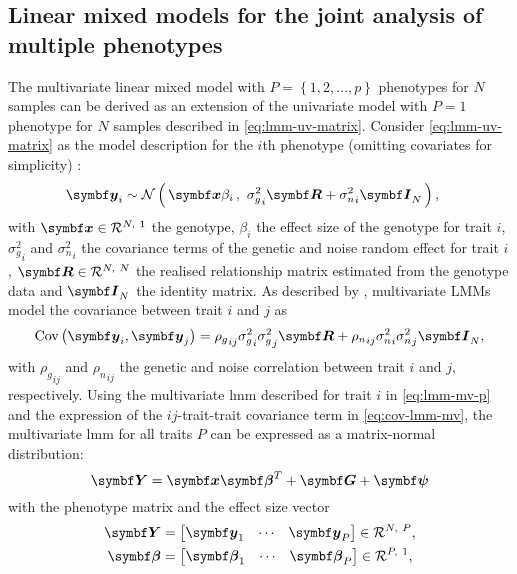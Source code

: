 \subsection{Linear mixed models for the joint analysis of multiple phenotypes}
The multivariate linear mixed model with \(P=\left\{1,2,\dots,p\right\}\) phenotypes for \(N\) samples can be derived as an extension of the univariate model with \(P=1\) phenotype for \(N\) samples described in \cref{eq:lmm-uv-matrix}. Consider \cref{eq:lmm-uv-matrix} as the model description for the \(i\)th phenotype (omitting covariates for simplicity) :
\begin{align} 
\mat{y}_i &\sim \normal {\mat{x}\beta_i}{{\sigma_g^2}_i\mat{R} + {\sigma_n^2}_i\mat{I}_N},
\label{eq:lmm-mv-p}
\end{align}
%
with \(\mat{x} \inR N 1\) the genotype, \(\beta_i\) the effect size of the genotype for trait \(i\),  \({\sigma_g^2}_i\) and \({\sigma_n^2}_i\) the covariance terms of the genetic and noise random effect for trait \(i\), \(\mat{R} \inR N N\)  the realised relationship matrix estimated from the genotype data and \(\mat{I}_N\) the identity matrix. As described by \citet{Henderson1976}, multivariate LMMs model the covariance between trait \(i\) and \(j\) as
\begin{align}
\text{Cov}\left(\mat{y}_i, \mat{y}_j\right) = {\rho_g}_{ij}{\sigma_g^2}_i{\sigma_g^2}_j\mat{R} +  {\rho_n}_{ij}{\sigma_n^2}_i{\sigma_n^2}_j\mat{I}_N,
\label{eq:cov-lmm-mv}
\end{align}
%
with \( {\rho_g}_{ij}\) and \( {\rho_n}_{ij}\) the genetic and noise correlation between trait \(i\) and \(j\), respectively. Using the multivariate \gls{lmm} described for trait \(i\) in \cref{eq:lmm-mv-p} and the expression of the \(ij\)-trait-trait covariance term in \cref{eq:cov-lmm-mv}, the multivariate \gls{lmm} for all traits \(P\) can be expressed as a matrix-normal distribution:
%
\begin{equation}
\mat{Y} = \mat{x}\mat{\beta}^T + \mat{G} + \mat{\psi}
\label{eq:lmm-mv}
\end{equation}
%
with the phenotype matrix  and the effect size vector \tmat{\beta}
%
\begin{align}
 \mat{Y} &=
  \begin{bmatrix} 
 	\mat{y}_{1} & \cdots & \mat{y}_{P} 
 \end{bmatrix} \inR N P,\\
%
 \mat{\beta} &=
  \begin{bmatrix} 
 	\mat{\beta}_{1} & \cdots & \mat{\beta}_{P} 
 \end{bmatrix} \inR P 1,\\
 \end{align}
